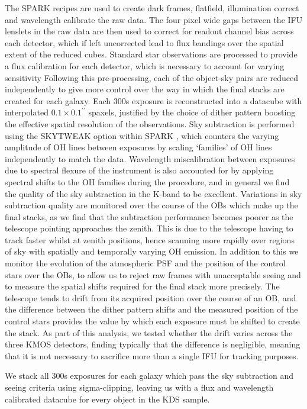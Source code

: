 \documentclass[a4paper,fleqn,usenatbib]{mn2e}
\begin{document}
The SPARK recipes are used to create dark frames, flatfield, illumination correct and wavelength calibrate the raw data.
The four pixel wide gaps between the IFU lenslets in the raw data are then used to correct for readout channel bias across each detector, which if left uncorrected lead to flux bandings over the spatial extent of the reduced cubes.
Standard star observations are processed to provide a flux calibration for each detector, which is necessary to account for varying sensitivity  
Following this pre-processing, each of the object-sky pairs are reduced independently to give more control over the way in which the final stacks are created for each galaxy.
Each 300s exposure is reconstructed into a datacube with interpolated $0.1\times0.1^{\prime\prime}$ spaxels, justified by the choice of dither pattern boosting the effective spatial resolution of the observations.
Sky subtraction is performed using the SKYTWEAK option within SPARK \citep{Davies2007}, which counters the varying amplitude of OH lines between exposures by scaling `families' of OH lines independently to match the data.
Wavelength miscalibration between exposures due to spectral flexure of the instrument is also accounted for by applying spectral shifts to the OH families during the procedure, and in general we find the quality of the sky subtraction in the K-band to be excellent. 
Variations in sky subtraction quality are monitored over the course of the OBs which make up the final stacks, as we find that the subtraction performance becomes poorer as the telescope pointing approaches the zenith.
This is due to the telescope having to track faster whilst at zenith positions, hence scanning more rapidly over regions of sky with spatially and temporally varying OH emission.
In addition to this we monitor the evolution of the atmospheric PSF and the position of the control stars over the OBs, to allow us to reject raw frames with unacceptable seeing and to measure the spatial shifts required for the final stack more precisely.
The telescope tends to drift from its acquired position over the course of an OB, and the difference between the dither pattern shifts and the measured position of the control stars provides the value by which each exposure must be shifted to create the stack.
As part of this analysis, we tested whether the drift varies across the three KMOS detectors, finding typically that the difference is negligible, meaning that it is not necessary to sacrifice more than a single IFU for tracking purposes.

We stack all 300s exposures for each galaxy which pass the sky subtraction and seeing criteria using sigma-clipping, leaving us with a flux and wavelength calibrated datacube for every object in the KDS sample.
\end{document}
